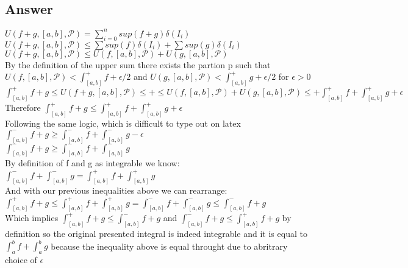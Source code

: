 \documentclass{article}
\begin{document}
\subsection*{Answer}
\(U(f+g, [a,b], \mathcal{P}) = \sum\limits^{n}_{i=0} sup(f + g) 
\delta(I_{i})\) \\
\(U(f+g, [a,b], \mathcal{P}) \leq \sum sup(f)\delta(I_{i}) + \sum sup(g)
\delta(I_{i})\) \\
\(U(f+g, [a,b], \mathcal{P}) \leq U(f, [a,b], \mathcal{P}) + 
U(g, [a,b], \mathcal{P})\) \\
By the definition of the upper sum there exists the partion p such that \\
\(U(f, [a,b], \mathcal{P}) < \int_{[a,b]}^{+}f + \epsilon/2\) and
\(U(g, [a,b], \mathcal{P}) < \int_{[a,b]}^{+}g + \epsilon/2\) for \(\epsilon > 0\)\\
\(\int_{[a,b]}^{+}f+g \leq U(f+g, [a,b], \mathcal{P}) \leq +
\leq U(f, [a,b], \mathcal{P}) + U(g, [a,b], \mathcal{P}) \leq +
\int_{[a,b]}^{+}f + \int_{[a,b]}^{+}g + \epsilon\) \\
Therefore \(\int_{[a,b]}^{+}f+g \leq 
\int_{[a,b]}^{+}f + \int_{[a,b]}^{+}g + \epsilon\) \\
Following the same logic, which is difficult to type out on latex \\
\(\int_{[a,b]}^{-}f+g \geq \int_{[a,b]}^{-}f + \int_{[a,b]}^{-}g -
\epsilon\) \\
\(\int_{[a,b]}^{-}f+g \geq \int_{[a,b]}^{-}f + \int_{[a,b]}^{-}g\) \\
By definition of f and g as integrable we know:\\
\(\int_{[a,b]}^{-}f + \int_{[a,b]}^{-}g = \int_{[a,b]}^{+}f + 
\int_{[a,b]}^{+}g\) \\
And with our previous inequalities above we can rearrange: \\
\(\int_{[a,b]}^{+}f+g \leq \int_{[a,b]}^{+}f + \int_{[a,b]}^{+}g =
\int_{[a,b]}^{-}f + \int_{[a,b]}^{-}g \leq \int_{[a,b]}^{-}f+g\) \\
Which implies \(\int_{[a,b]}^{+}f+g \leq \int_{[a,b]}^{-}f+g\) and
\(\int_{[a,b]}^{-}f+g \leq \int_{[a,b]}^{+}f+g\) by definition so the 
original presented integral is indeed integrable and it is equal to 
\(\int_{a}^{b}f + \int_{a}^{b}g\) because the inequality above is equal throught due to abritrary choice of \(\epsilon\)



\section{}
\end{document}
